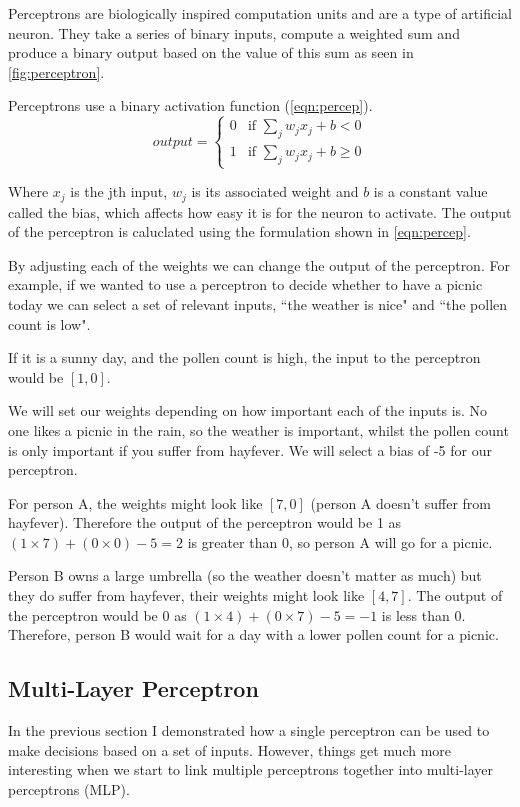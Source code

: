 Perceptrons are biologically inspired computation units and are a type of artificial neuron. They take a series of binary inputs, compute a weighted sum and produce a binary output based on the value of this sum as seen in \autoref{fig:perceptron}.


Perceptrons use a binary activation function (\autoref{eqn:percep}).
\begin{equation} \label{eqn:percep}
output = \begin{cases}
0 &\text{if $\sum_{j} w_j x_j + b < 0$}\\
1 &\text{if $\sum_{j} w_j x_j + b \geq 0$}
\end{cases} 
\end{equation}

Where $x_j$ is the jth input, $w_j$ is its associated weight and $b$ is a constant value called the bias, which affects how easy it is for the neuron to activate. The output of the perceptron is caluclated using the formulation shown in \autoref{eqn:percep}.

By adjusting each of the weights we can change the output of the perceptron. For example, if we wanted to use a perceptron to decide whether to have a picnic today we can  select a set of relevant inputs, ``the weather is nice" and ``the pollen count is low".

If it is a sunny day, and the pollen count is high, the input to the perceptron would be $[1,0]$.
 
We will set our weights depending on how important each of the inputs is. No one likes a picnic in the rain, so the weather is important, whilst the pollen count is only important if you suffer from hayfever. We will select a bias of -5 for our perceptron.

For person A, the weights might look like $[7, 0]$ (person A doesn't suffer from hayfever). Therefore the output of the perceptron would be 1 as $(1 \times 7) + (0 \times 0) - 5 = 2$ is greater than 0, so person A will go for a picnic.

Person B owns a large umbrella (so the weather doesn't matter as much) but they do suffer from hayfever, their weights might look like $[4, 7]$. The output of the perceptron would be 0 as  $(1 \times 4) + (0 \times 7) - 5 = -1$ is less than 0. Therefore, person B would wait for a day with a lower pollen count for a picnic.


\subsection{Multi-Layer Perceptron}
In the previous section I demonstrated how a single perceptron can be used to make decisions based on a set of inputs. However, things get much more interesting when we start to link multiple perceptrons together into multi-layer perceptrons (MLP).

